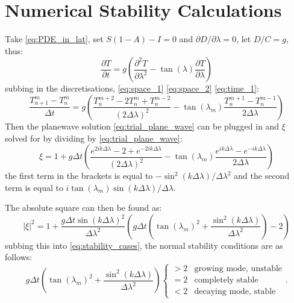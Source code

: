 \documentclass[12pt, onecolumn]{revtex4-2}    %
\begin{document}
\clearpage

\appendix

\section{Numerical Stability Calculations} \label{app:numstabworkings}

Take \eqref{eq:PDE_in_lat}, set $S(1-A) - I = 0$ and $\partial D / \partial \lambda = 0$,
let $D / C = g$, thus:
\begin{equation*}
    \frac{\partial T}{\partial t} = g \left(\frac{\partial^2 T}{\partial \lambda^2} - \tan(\lambda)\frac{\partial T}{\partial \lambda}\right)
\end{equation*}
subbing in the discretisations, \eqref{eq:space_1} \eqref{eq:space_2} \eqref{eq:time_1}:
\begin{equation*}
    \frac{T^m_{n+1}-T^m_n}{\Delta t} = g \left(\frac{T^{m+2}_{n} - 2T^{m}_{n} + T^{m-2}_{n}}{(2\Delta \lambda)^2} - \tan(\lambda_m)\frac{T^{m+1}_{n} - T^{m-1}_{n}}{2 \Delta \lambda}\right)
\end{equation*}
Then the planewave solution \eqref{eq:trial_plane_wave} can be plugged in and $\xi$ solved for by dividing by \eqref{eq:trial_plane_wave}:
\begin{equation*}
    \xi = 1 + g \Delta t \left( \frac{e^{2ik\Delta\lambda} - 2 + e^{-2ik\Delta\lambda}}{(2\Delta\lambda)^2} - \tan(\lambda_m) \frac{e^{ik\Delta\lambda} - e^{-ik\Delta\lambda}}{2\Delta\lambda} \right)
\end{equation*}
the first term in the brackets is equal to $-\sin^2(k\Delta\lambda) / \Delta\lambda^2$ and the second term is equal to $i\tan(\lambda_m)\sin(k\Delta\lambda) / \Delta\lambda$.

The absolute square can then be found as:
\begin{equation*}
    |\xi|^2 = 1 + \frac{g \Delta t \sin(k\Delta\lambda)^2}{\Delta \lambda^2}\left(g\Delta t\left(\tan(\lambda_m)^2 + \frac{\sin^2(k\Delta\lambda)}{\Delta\lambda^2}\right) - 2 \right)
\end{equation*}
subbing this into \eqref{eq:stability_cases}, the normal stability conditions are as follows:
\begin{equation}\label{appeq:normalstability}
    g\Delta t\left(\tan(\lambda_m)^2 + \frac{\sin^2(k\Delta\lambda)}{\Delta\lambda^2}\right)
    \begin{cases}
        > 2 & \text{growing mode, unstable} \\
        = 2 & \text{completely stable}      \\
        < 2 & \text{decaying mode, stable}
    \end{cases}
    .
\end{equation}
\end{document}
